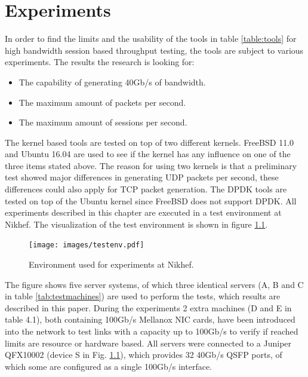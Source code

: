 \chapter{Experiments}\label{ch:experiments}
In order to find the limits and the usability of the tools in table \ref{table:tools} for high bandwidth session based throughput testing, the tools are subject to various experiments.
The results the research is looking for: 
\begin{itemize}
\item{The capability of generating 40Gb/s of bandwidth.} 
\item{The maximum amount of packets per second.} 
\item{The maximum amount of sessions per second.}
\end{itemize}

The kernel based tools are tested on top of two different kernels. 
FreeBSD 11.0 and Ubuntu 16.04 are used to see if the kernel has any influence on one of the three items stated above.
The reason for using two kernels is that a preliminary test showed major differences in generating UDP packets per second, these differences could also apply for TCP packet generation.  
The DPDK tools are tested on top of the Ubuntu kernel since FreeBSD does not support DPDK.
All experiments described in this chapter are executed in a test environment at Nikhef. The visualization of the test environment is shown in figure \ref{fig:testenv}. \\ 

\begin{figure}[H]
  \texttt{[image: images/testenv.pdf]}
  \caption{Environment used for experiments at Nikhef.}
  \label{fig:testenv}
\end{figure}

The figure shows five server systems, of which three identical servers (A, B and C in table \ref{tab:testmachines}) are used to perform the tests, which results are described in this paper.
During the experiments 2 extra machines (D and E in table 4.1), both containing 100Gb/s Mellanox NIC cards, have been introduced into the network to test links with a capacity up to 100Gb/s to verify if reached limits are resource or hardware based. All servers were connected to a Juniper QFX10002 (device S in Fig. \ref{fig:testenv}), which provides 32 40Gb/s QSFP ports, of which some are configured as a single 100Gb/s interface.

